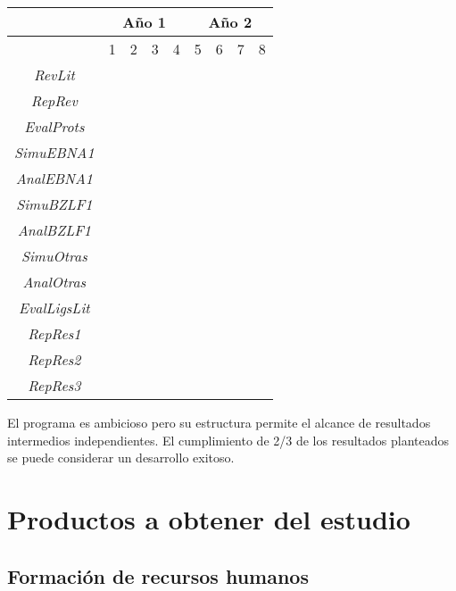 \documentclass[12pt,letterpaper]{article} %
\begin{document}
\begin{table}[!htbp]
	\centering
		\begin{tabular}{|c|c|c|c|c|c|c|c|c|}
      \hline
      &\multicolumn{4}{c|}{Año 1}&\multicolumn{4}{c|}{Año 2}\\
      \hline
		&1&2&3&4&5&6&7&8\\
		\hline
		\emph{RevLit}&\cellcolor{midgray}&&&&&&&\\
		\hline
		\emph{RepRev}&&\cellcolor{midgray}&&&&&&\\
		\hline	
		\emph{EvalProts}&&\cellcolor{midgray}&&&&&&\\
		\hline			
		\emph{SimuEBNA1}&&&\cellcolor{midgray}&\cellcolor{midgray}&&&&\\
		\hline	
		\emph{AnalEBNA1}&&&&\cellcolor{midgray}&\cellcolor{midgray}&&&\\
		\hline
		\emph{SimuBZLF1}&&&&\cellcolor{midgray}&\cellcolor{midgray}&&&\\
		\hline	
		\emph{AnalBZLF1}&&&&&\cellcolor{midgray}&\cellcolor{midgray}&&\\
		\hline	
		\emph{SimuOtras}&&&&&\cellcolor{midgray}&\cellcolor{midgray}&&\\
		\hline	
		\emph{AnalOtras}&&&&&&\cellcolor{midgray}&\cellcolor{midgray}&\\
		\hline	
		\emph{EvalLigsLit}&&&&&&&&\cellcolor{midgray}\\
		\hline	
		\emph{RepRes1}&&&&&\cellcolor{midgray}&\cellcolor{midgray}&&\\
		\hline	
		\emph{RepRes2}&&&&&&\cellcolor{midgray}&\cellcolor{midgray}&\\
		\hline	
		\emph{RepRes3}&&&&&&&\cellcolor{midgray}&\cellcolor{midgray}\\
		\hline	
		\end{tabular}
\end{table}

El programa es ambicioso pero su estructura permite el alcance de resultados
intermedios independientes. El cumplimiento de 2/3 de los resultados planteados
se puede considerar un desarrollo exitoso.

\section{Productos a obtener del estudio}

\subsection{Formación de recursos humanos}
\end{document}
